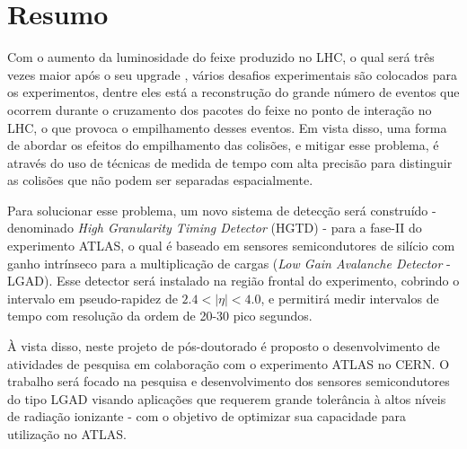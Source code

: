 \chapter*{Resumo}


Com o aumento da luminosidade do feixe produzido no LHC, o qual será três vezes maior após o seu upgrade \cite{HL_LHC,tdr}, vários desafios experimentais são colocados para os experimentos, dentre eles está a reconstrução do grande número de eventos que ocorrem durante o cruzamento dos pacotes do feixe no ponto de interação no LHC, o que provoca o empilhamento desses eventos.
Em vista disso, uma forma de abordar os efeitos do empilhamento das colisões, e mitigar esse problema, é através do uso de técnicas de medida de tempo com alta precisão para distinguir as colisões que não podem ser separadas espacialmente. 

Para solucionar esse problema, um novo sistema de detecção será construído - denominado {\it High Granularity Timing Detector} (HGTD) - para a fase-II do experimento ATLAS, o qual é baseado em sensores semicondutores de silício com ganho intrínseco para a multiplicação de cargas
({\it Low Gain Avalanche Detector} - LGAD). Esse detector será instalado na região frontal do experimento, cobrindo o intervalo em pseudo-rapidez de $2.4< |\eta| <4.0$, e permitirá medir intervalos de tempo com resolução da ordem de 20-30 pico segundos.


À vista disso, neste projeto de pós-doutorado é proposto o desenvolvimento de atividades de pesquisa em colaboração com o experimento ATLAS no CERN. O trabalho será focado na pesquisa e desenvolvimento dos sensores semicondutores do tipo LGAD visando aplicações que requerem grande tolerância à altos níveis de radiação ionizante \cite{JIN_LGAD,NIMA_LGAD,NIMA_LGAD_I,NIMA_LGAD_II,NIMA_LGAD_III} - com o objetivo de optimizar sua capacidade para utilização no ATLAS. %

